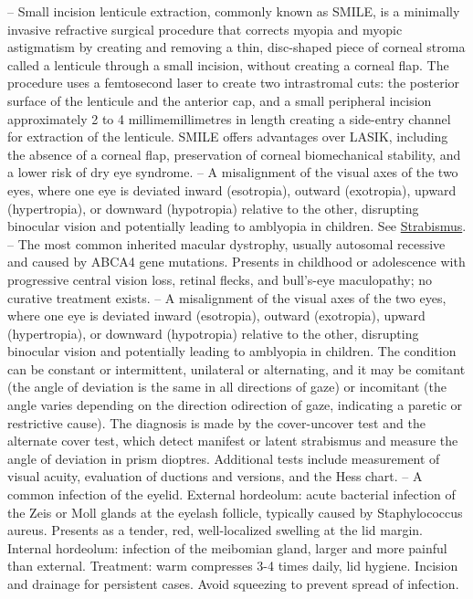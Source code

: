 -- Small incision lenticule extraction, commonly known as SMILE, is a minimally invasive refractive surgical procedure that corrects myopia and myopic astigmatism by creating and removing a thin, disc-shaped piece of corneal stroma called a lenticule through a small incision, without creating a corneal flap. The procedure uses a femtosecond laser to create two intrastromal cuts: the posterior surface of the lenticule and the anterior cap, and a small peripheral incision approximately 2 to 4 millimemillimetres in length creating a side-entry channel for extraction of the lenticule. SMILE offers advantages over LASIK, including the absence of a corneal flap, preservation of corneal biomechanical stability, and a lower risk of dry eye syndrome.
-- A misalignment of the visual axes of the two eyes, where one eye is deviated inward (esotropia), outward (exotropia), upward (hypertropia), or downward (hypotropia) relative to the other, disrupting binocular vision and potentially leading to amblyopia in children. See \hyperlink{Strabismus}{Strabismus}.
-- The most common inherited macular dystrophy, usually autosomal recessive and caused by ABCA4 gene mutations. Presents in childhood or adolescence with progressive central vision loss, retinal flecks, and bull's-eye maculopathy; no curative treatment exists.
-- A misalignment of the visual axes of the two eyes, where one eye is deviated inward (esotropia), outward (exotropia), upward (hypertropia), or downward (hypotropia) relative to the other, disrupting binocular vision and potentially leading to amblyopia in children. The condition can be constant or intermittent, unilateral or alternating, and it may be comitant (the angle of deviation is the same in all directions of gaze) or incomitant (the angle varies depending on the direction odirection of gaze, indicating a paretic or restrictive cause). The diagnosis is made by the cover-uncover test and the alternate cover test, which detect manifest or latent strabismus and measure the angle of deviation in prism dioptres. Additional tests include measurement of visual acuity, evaluation of ductions and versions, and the Hess chart.
-- A common infection of the eyelid. External hordeolum: acute bacterial infection of the Zeis or Moll glands at the eyelash follicle, typically caused by Staphylococcus aureus. Presents as a tender, red, well-localized swelling at the lid margin. Internal hordeolum: infection of the meibomian gland, larger and more painful than external. Treatment: warm compresses 3-4 times daily, lid hygiene. Incision and drainage for persistent cases. Avoid squeezing to prevent spread of infection.
